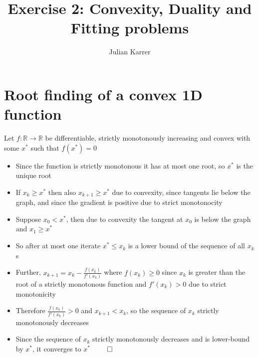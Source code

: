 \documentclass[oneside, a4paper]{book}
\author{Julian Karrer}
\title{Exercise 2: Convexity, Duality and Fitting problems}
\begin{document}
\chapter{Root finding of a convex 1D function}
Let $f: \mathds{R}\to\mathds{R}$ be differentiable, strictly monotonously increasing and convex with some $x^*$ such that $f(x^*)=0$
\begin{itemize}
    \item Since the function is strictly monotonous it has at most one root, so $x^*$ is the unique root 
    \item If $x_k \geq x^*$ then also $x_{k+1}\geq x^*$ due to convexity, since tangents lie below the graph, and since the gradient is positive due to strict monotonocity
    \item Suppose $x_0 < x^*$, then due to convexity the tangent at $x_0$ is below the graph and $x_1\geq x^*$
    \item So after at most one iterate $x^* \leq x_k$ is a lower bound of the sequence of all $x_k$s
    \item Further, $x_{k+1} = x_k - \frac{f(x_k)}{f'(x_k)}$ where $f(x_k)\geq 0$ since $x_k$ is greater than the root of a strictly monotonous function and $f'(x_k)>0$ due to strict monotonicity
    \item Therefore $\frac{f(x_k)}{f'(x_k)} > 0$ and $x_{k+1} < x_k$, so the sequence of $x_k$ strictly monotonously decreases
    \item Since the sequence of $x_k$ strictly monotonously decreases and is lower-bound by $x^*$, it converges to $x^*$ $\qed$
\end{itemize}
\end{document}
